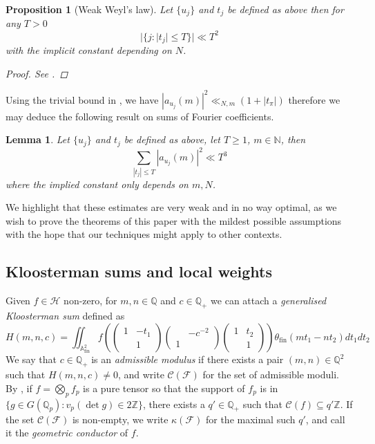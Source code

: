 \documentclass{article}
\newtheorem{lemma}[theorem]{Lemma}
\newtheorem{proposition}[theorem]{Proposition}
\numberwithin{equation}{section}
\begin{document}
\begin{proposition}[Weak Weyl's law] \label{prop:weyl-law}Let $\{u_j\}$ and $t_j$ be defined as above then for any $T>0$
\begin{equation}
    |\{j:|t_j|\leq T\}|\ll T^2
\end{equation}
with the implicit constant depending on $N$.
\begin{proof}
    See \cite[Theorem 1.1]{Donnelly1982}.
\end{proof}
\end{proposition}
Using the trivial bound in \cite[Theorem 3.2]{Spectralmethods}, we have $|a_{u_j}(m)|^2\ll_{N,m}(1+|t_\pi|)$ therefore we may deduce the following result on sums of Fourier coefficients.
\begin{lemma}\label{lemma:maass-growth}
    Let $\{u_j\}$ and $t_j$ be defined as above, let $T\geq 1$, $m \in \mathbb{N}$, then
    \begin{equation}
        \sum_{|t_j|\leq T}|a_{u_j}(m)|^2\ll T^3
    \end{equation}
    where the implied constant only depends on $m,N$.
\end{lemma}
We highlight that these estimates are very weak and in no way optimal, as we wish to prove the theorems of this paper with the mildest possible assumptions with the hope that our techniques might apply to other contexts.

\subsection{Kloosterman sums and local weights}\label{section:kloosterman-weights}
Given $f \in \mathcal{H}$ non-zero, for $m,n \in \mathbb{Q}$ and $c\in \mathbb{Q}_+$ we can attach a \emph{generalised Kloosterman sum} defined as
\begin{equation}\label{def:kloosterman-sum}
    H(m,n,c)=\iint_{\mathbb{A}_\text{fin}^2}f(\begin{pmatrix}
        1 & -t_1 \\ & 1
    \end{pmatrix}\begin{pmatrix}
        & -c^{-2} \\ 1 &
    \end{pmatrix}\begin{pmatrix}
        1 & t_2 \\ & 1
    \end{pmatrix})\theta_\text{fin}(mt_1-n t_2)dt_1 dt_2
\end{equation}
We say that $c\in \mathbb{Q}_+$ is an \emph{admissible modulus} if there exists a pair $(m,n) \in \mathbb{Q}^2$ such that $H(m,n,c)\neq 0$, and write $\mathcal{C}(\mathcal{F})$ for the set of admissible moduli. By \cite[Proposition/Definition 1.3]{generalised}, if $f=\bigotimes_p f_p$ is a pure tensor so that the support of $f_p$ is in $\{g \in G(\mathbb{Q}_p): v_p(\det g)\in 2\mathbb{Z}\}$, there exists a $q'\in \mathbb{Q_+}$ such that $\mathcal{C}(f) \subseteq q'\mathbb{Z}$. If the set $\mathcal{C}(\mathcal{F})$ is non-empty, we write $\kappa(\mathcal{F})$ for the maximal such $q'$, and call it the \emph{geometric conductor} of $f$.   \bigbreak
\end{document}
